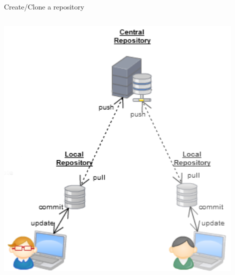 \begin{frame}[fragile]{Create/Clone a repository}
\begin{columns}
\begin{column}{0.4\textwidth}
\begin{center}
{					\includegraphics[width=0.9\textwidth]{clone.png}
				}
			\end{center}
		\end{column}
	\end{columns}
\end{frame}


